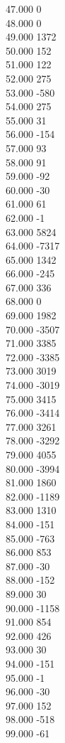 { 47.000	0 \\
 48.000	0 \\
 49.000	1372 \\
 50.000	152 \\
 51.000	122 \\
 52.000	275 \\
 53.000	-580 \\
 54.000	275 \\
 55.000	31 \\
 56.000	-154 \\
 57.000	93 \\
 58.000	91 \\
 59.000	-92 \\
 60.000	-30 \\
 61.000	61 \\
 62.000	-1 \\
 63.000	5824 \\
 64.000	-7317 \\
 65.000	1342 \\
 66.000	-245 \\
 67.000	336 \\
 68.000	0 \\
 69.000	1982 \\
 70.000	-3507 \\
 71.000	3385 \\
 72.000	-3385 \\
 73.000	3019 \\
 74.000	-3019 \\
 75.000	3415 \\
 76.000	-3414 \\
 77.000	3261 \\
 78.000	-3292 \\
 79.000	4055 \\
 80.000	-3994 \\
 81.000	1860 \\
 82.000	-1189 \\
 83.000	1310 \\
 84.000	-151 \\
 85.000	-763 \\
 86.000	853 \\
 87.000	-30 \\
 88.000	-152 \\
 89.000	30 \\
 90.000	-1158 \\
 91.000	854 \\
 92.000	426 \\
 93.000	30 \\
 94.000	-151 \\
 95.000	-1 \\
 96.000	-30 \\
 97.000	152 \\
 98.000	-518 \\
 99.000	-61 \\
}
